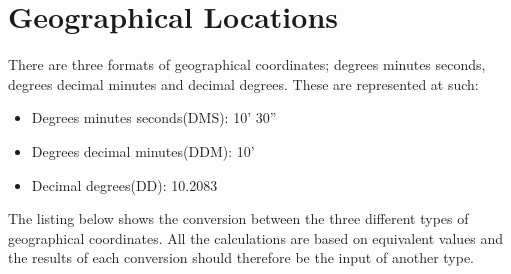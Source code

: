 \section{Geographical Locations} \label{sec:geo_coordinates}
There are three formats of geographical coordinates; degrees minutes seconds, degrees decimal minutes and decimal degrees. These are represented at such:
\begin{itemize}
	\item Degrees minutes seconds(DMS): 10' 30''
	\item Degrees decimal minutes(DDM): 10'
	\item Decimal degrees(DD): 10.2083\degree
\end{itemize}

The listing below shows the conversion between the three different types of geographical coordinates. All the calculations are based on equivalent values and the results of each conversion should therefore be the input of another type.

